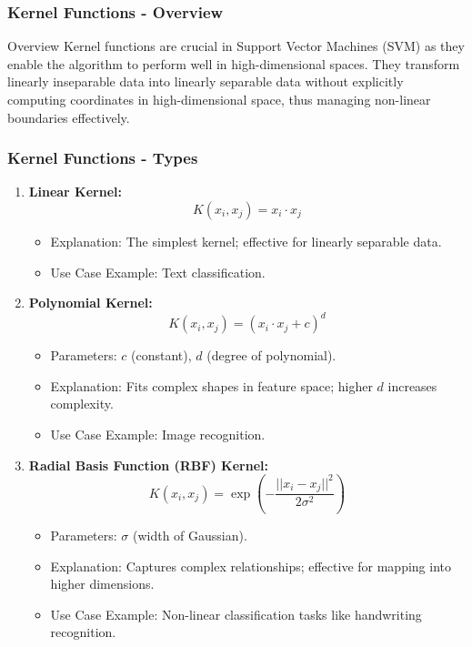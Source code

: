 \documentclass[aspectratio=169]{beamer}
\begin{document}
\begin{frame}[fragile]
    \frametitle{Kernel Functions - Overview}
    \begin{block}{Overview}
        Kernel functions are crucial in Support Vector Machines (SVM) as they enable the algorithm to perform well in high-dimensional spaces. They transform linearly inseparable data into linearly separable data without explicitly computing coordinates in high-dimensional space, thus managing non-linear boundaries effectively.
    \end{block}
\end{frame}

\begin{frame}[fragile]
    \frametitle{Kernel Functions - Types}
    \begin{enumerate}
        \item \textbf{Linear Kernel:}
            \begin{equation}
                K(x_i, x_j) = x_i \cdot x_j
            \end{equation}
            \begin{itemize}
                \item Explanation: The simplest kernel; effective for linearly separable data.
                \item Use Case Example: Text classification.
            \end{itemize}
        
        \item \textbf{Polynomial Kernel:}
            \begin{equation}
                K(x_i, x_j) = (x_i \cdot x_j + c)^d
            \end{equation}
            \begin{itemize}
                \item Parameters: \(c\) (constant), \(d\) (degree of polynomial).
                \item Explanation: Fits complex shapes in feature space; higher \(d\) increases complexity.
                \item Use Case Example: Image recognition.
            \end{itemize}
        
        \item \textbf{Radial Basis Function (RBF) Kernel:}
            \begin{equation}
                K(x_i, x_j) = \exp\left(-\frac{||x_i - x_j||^2}{2\sigma^2}\right)
            \end{equation}
            \begin{itemize}
                \item Parameters: \(\sigma\) (width of Gaussian).
                \item Explanation: Captures complex relationships; effective for mapping into higher dimensions.
                \item Use Case Example: Non-linear classification tasks like handwriting recognition.
            \end{itemize}
    \end{enumerate}
\end{frame}
\end{document}
